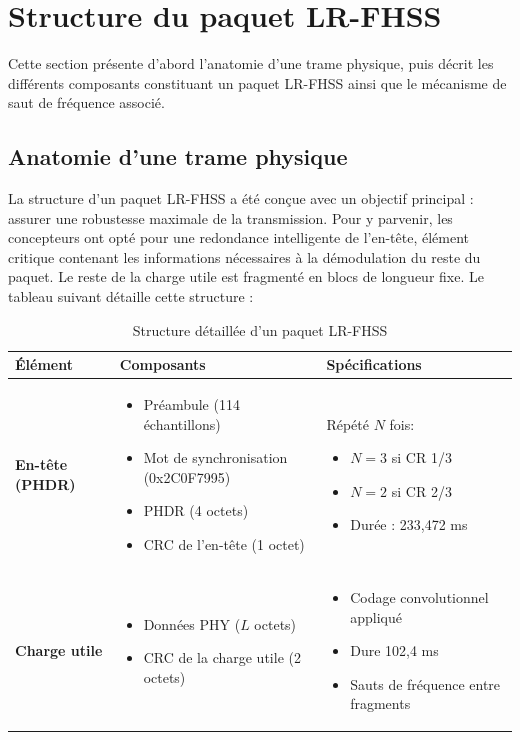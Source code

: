 \section{Structure du paquet LR-FHSS}

Cette section présente d’abord l’anatomie d’une trame physique, puis décrit les
différents composants constituant un paquet LR-FHSS ainsi que le mécanisme de saut de fréquence associé.

\subsection{Anatomie d'une trame physique}

La structure d'un paquet LR-FHSS a été conçue avec un objectif principal : assurer une robustesse maximale de la transmission. Pour y parvenir, les concepteurs ont opté pour une redondance intelligente de l'en-tête, élément critique contenant les informations nécessaires à la démodulation du reste du paquet. Le reste de la charge utile est fragmenté en blocs de longueur fixe.
Le tableau suivant détaille cette structure :

\begin{table}[htbp]
	\centering
	\caption{Structure détaillée d'un paquet LR-FHSS}
	\label{tab:packet_structure}
	\small
	\begin{tabular}{|p{3cm}|p{7cm}|p{5cm}|}
		\hline
		\textbf{Élément} & \textbf{Composants} & \textbf{Spécifications} \\
		\hline
		\textbf{En-tête (PHDR)} & 
		\parbox[t]{7cm}{
			\begin{itemize}[leftmargin=*,nosep]
				\item Préambule (114 échantillons)
				\item Mot de synchronisation (0x2C0F7995)
				\item PHDR (4 octets)
				\item CRC de l'en-tête (1 octet)
		\end{itemize}} & 
		\parbox[t]{4cm}{
			Répété $N$ fois: 
			\begin{itemize}[leftmargin=*,nosep]
				\item $N=3$ si CR 1/3
				\item $N=2$ si CR 2/3
				\item Durée : 233,472 ms
		\end{itemize}} \\
		\hline
		\textbf{Charge utile} & 
		\parbox[t]{8cm}{
			\begin{itemize}[leftmargin=*,nosep]
				\item Données PHY ($L$ octets)
				\item CRC de la charge utile (2 octets)
		\end{itemize}} & 
		\parbox[t]{5cm}{
			\begin{itemize}[leftmargin=*,nosep]
				\item Codage convolutionnel appliqué
				\item Dure 102,4 ms
				\item Sauts de fréquence entre fragments
		\end{itemize}} \\
		\hline
	\end{tabular}
\end{table}

